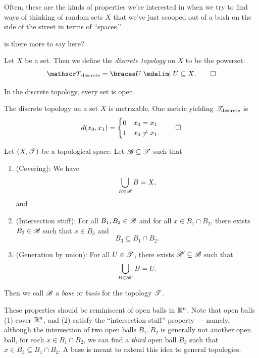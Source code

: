 \documentclass{fkpaper}
\begin{document}
\begin{multicols}{2}
  Often, these are the kinds of properties we're interested in when we
  try to find ways of thinking of random sets $X$ that we've just
  scooped out of a bush on the side of the street in terms of
  ``spaces.''

  {\color{blue} is there more to say here?}

  \begin{definition}
    Let $X$ be a set. Then we define the \emph{discrete topology} on
    $X$ to be the powerset:
    \[
      \ms T_{\rm discrete} = \set{U \MID U \subseteq X}. \qedhere
    \]
  \end{definition}
  In the discrete topology, every set is open.
  \begin{proposition}
    The discrete topology on a set $X$ is metrizable. One metric
    yielding ${\mathscr{T}}_{\rm discrete}$ is
    \[
      d(x_0, x_1) =
      \begin{cases}
        0 & x_0 = x_1 \\
        1 & x_0 \neq x_1.
      \end{cases} \qedhere
    \]
  \end{proposition}
  \begin{definition}[Base]\label{def:base}
    Let $(X, {\mathscr{T}})$ be a topological space. Let ${\mathscr{B}} \subseteq {\mathscr{T}}$ such that
    \begin{enumerate}
      \item (Covering): We have
        \[
        \bigcup_{B \in {\mathscr{B}}} B = X,
        \]
        and
      \item (Intersection stuff): For all $B_1, B_2 \in {\mathscr{B}}$ and
        for all $x \in B_1 \cap B_2$, there exists $B_3 \in {\mathscr{B}}$
        such that $x \in B_3$ and
        \[
        B_3 \subseteq B_1 \cap B_2.
        \]
      \item (Generation by union): For all $U \in {\mathscr{T}}$, there exists
        ${\mathscr{B}}' \subseteq {\mathscr{B}}$ such that
        \[
        \bigcup_{B \in {\mathscr{B}}'} B = U.
        \]
    \end{enumerate}
    Then we call ${\mathscr{B}}$ a \emph{base} or \emph{basis} for the
    topology ${\mathscr{T}}$.
  \end{definition}
  These properties should be reminiscent of open balls in $\mathbb{R}^n$.
  Note that open balls (1) cover $\mathbb{R}^n$, and (2) satisfy the
  ``intersection stuff'' property --- namely, although the
  intersection of two open balls $B_1, B_2$ is generally not another
  open ball, for each $x \in B_1 \cap B_2$, we can find a \emph{third}
  open ball $B_3$ such that $x \in B_3 \subseteq B_1 \cap B_2$. A base
  is meant to extend this idea to general topologies.


\end{multicols}
\end{document}
